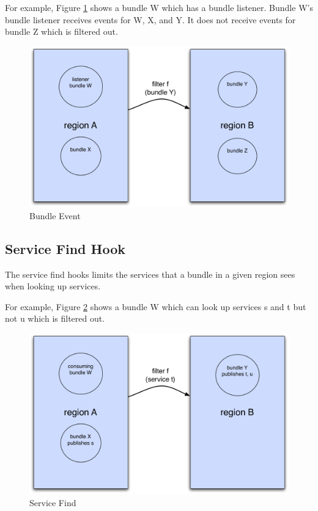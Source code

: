 \documentclass[a4paper,9pt]{article}
\begin{document}
For example, Figure \ref{fig:bevent} shows a bundle W which has a bundle listener.
Bundle W's bundle listener receives events for W, X, and Y. It does not receive events for bundle Z which is filtered out. 
\begin{figure}[h!]
\begin{center}
\includegraphics*[scale=0.4]{bundle-event.pdf}
\caption{Bundle Event \label{fig:bevent}}
\end{center}
\end{figure}

\subsection{Service Find Hook}

The service find hooks limits the services that a bundle in a given region sees when looking up services.

For example, Figure \ref{fig:sfind} shows a bundle W which can look up services s and t but not u which is filtered out.
\begin{figure}[h!]
\begin{center}
\includegraphics*[scale=0.4]{service-find.pdf}
\caption{Service Find \label{fig:sfind}}
\end{center}
\end{figure}
\end{document}
